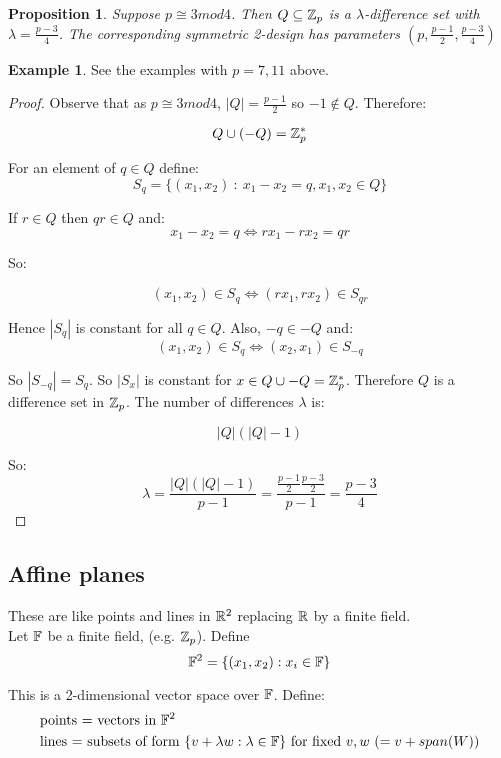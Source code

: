 \documentclass[]{article}
\newtheorem{prop}[thm]{Proposition}
\theoremstyle{definition}
\newtheorem*{exmp}{Example}
\theoremstyle{remark}
\numberwithin{equation}{section}
\begin{document}
				\begin{prop}
					Suppose $p \cong 3 mod 4$. Then $Q \subseteq \mathbb{Z}_p$ is a $\lambda$-difference set with $\lambda = \frac{p-3}{4}$. The corresponding symmetric 2-design has parameters $(p, \frac{p-1}{2}, \frac{p-3}{4})$
				\end{prop}

				\begin{exmp}
					See the examples with $p=7,11$ above.
				\end{exmp}

				\begin{proof}
					Observe that as $p \cong 3 mod 4$, $|Q| = \frac{p-1}{2}$ so $-1 \notin Q$. Therefore:

					\[
						Q \cup (-Q) = \mathbb{Z}_p^*
					\]

					For an element of $q\in Q$ define:
					\[
						S_q = \{ (x_1, x_2)\ :\ x_1 - x_2 = q, x_1, x_2 \in Q \}
					\]


					If $r \in Q$ then $qr \in Q$ and:
					\[
						x_1 - x_2 = q \iff rx_1 - rx_2 = qr
					\]

					So:

					\[
						(x_1, x_2) \in S_q \iff (rx_1, rx_2) \in S_{qr}
					\]

					Hence $|S_q|$ is constant for all $q \in Q$. Also, $-q \in -Q$ and:
					\[
						(x_1, x_2 )\in S_q \iff (x_2, x_1) \in S_{-q}
					\]

					So $|S_{-q}| = S_q$. So $|S_x|$ is constant for $x \in Q \cup -Q = \mathbb{Z}_p^*$.
					Therefore $Q$ is a difference set in $\mathbb{Z}_p$. The number of differences $\lambda$ is:

					\[
						|Q|(|Q|-1)
					\]

					So:
					\[
						\lambda = \frac{|Q|(|Q|-1)}{p-1} = \frac{\frac{p-1}{2}\frac{p-3}{2}}{p-1} = \frac{p-3}{4}
					\]
				\end{proof}
		\subsection*{Affine planes}
			These are like points and lines in $\mathbb R^2$ replacing $\mathbb R$ by a finite field.\\
			Let $\mathbb F$ be a finite field, (e.g. $\mathbb{Z}_p$). Define
			\[
				\mathbb F^2 = \{(x_1, x_2): x_i \in \mathbb F\}
			\]

			This is a 2-dimensional vector space over $\mathbb F$. Define:
			\begin{align*}
				&\text{points = vectors in $\mathbb F^2$}\\
				&\text{lines = subsets of form $\{v + \lambda w: \lambda \in \mathbb F \}$ for fixed $v, w$  ($= v + span(W)$)}
			\end{align*}
\end{document}
